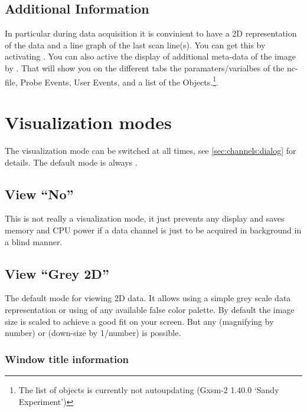 \subsection{Additional Information}
In particular during data acquisition it is convinient to have a 2D representation of the data and a line graph of the last scan line(s). You can get this by activating . You can also active the display of additional meta-data of the image by . That will show you on the different tabs the paramaters/varialbes of the nc-file, Probe Events, User Events, and a list of the Objects.\footnote{The list of objects is currently not autoupdating (Gxsm-2 1.40.0 `Sandy Experiment')}.


\section{Visualization modes}

\label{Gxsm-Visualisation}

The visualization mode can be switched at all times, see
\ref{sec:channels:dialog} for details. 
The default mode is always .

\subsection{View ``No''}

This is not really a visualization mode, it just prevents any display
and saves memory and CPU power if a data channel is just to be
acquired in background in a blind manner.

\subsection{View ``Grey 2D''}

The default mode for viewing 2D data. It allows using a simple grey
scale data representation or using of any available false color
palette.  By default the image size is scaled to achieve a good fit on
your screen. But any  (magnifying by number) or
 (down-size by 1/number) is possible.

\subsubsection{Window title information}

